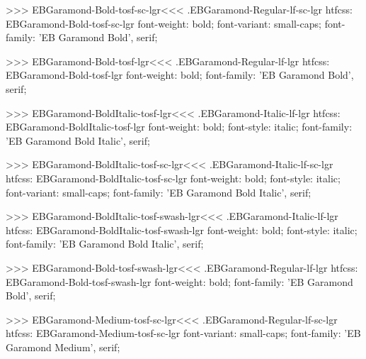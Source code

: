 >>>
\<EBGaramond-Bold-tosf-sc-lgr\><<<
.EBGaramond-Regular-lf-sc-lgr
htfcss:  EBGaramond-Bold-tosf-sc-lgr  font-weight: bold; font-variant: small-caps; font-family: 'EB Garamond Bold', serif;

>>>
\<EBGaramond-Bold-tosf-lgr\><<<
.EBGaramond-Regular-lf-lgr
htfcss:  EBGaramond-Bold-tosf-lgr  font-weight: bold; font-family: 'EB Garamond Bold', serif;

>>>
\<EBGaramond-BoldItalic-tosf-lgr\><<<
.EBGaramond-Italic-lf-lgr
htfcss:  EBGaramond-BoldItalic-tosf-lgr  font-weight: bold; font-style: italic; font-family: 'EB Garamond Bold Italic', serif;

>>>
\<EBGaramond-BoldItalic-tosf-sc-lgr\><<<
.EBGaramond-Italic-lf-sc-lgr
htfcss:  EBGaramond-BoldItalic-tosf-sc-lgr  font-weight: bold; font-style: italic; font-variant: small-caps; font-family: 'EB Garamond Bold Italic', serif;

>>>
\<EBGaramond-BoldItalic-tosf-swash-lgr\><<<
.EBGaramond-Italic-lf-lgr
htfcss:  EBGaramond-BoldItalic-tosf-swash-lgr  font-weight: bold; font-style: italic; font-family: 'EB Garamond Bold Italic', serif;

>>>
\<EBGaramond-Bold-tosf-swash-lgr\><<<
.EBGaramond-Regular-lf-lgr
htfcss:  EBGaramond-Bold-tosf-swash-lgr  font-weight: bold; font-family: 'EB Garamond Bold', serif;

>>>
\<EBGaramond-Medium-tosf-sc-lgr\><<<
.EBGaramond-Regular-lf-sc-lgr
htfcss:  EBGaramond-Medium-tosf-sc-lgr  font-variant: small-caps; font-family: 'EB Garamond Medium', serif;

